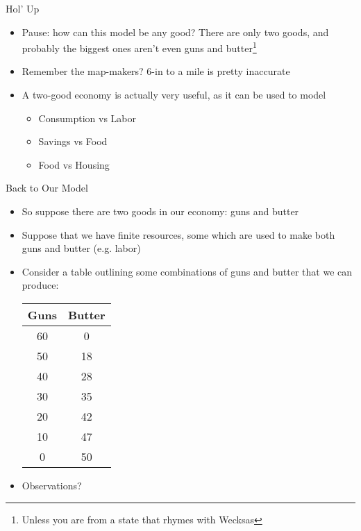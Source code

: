 \documentclass[10pt,xcolor={svgnames}]{beamer}
\begin{document}
\begin{frame}{Hol' Up}
    \begin{itemize}[<+->]
        \item Pause: how can this model be any good? There are only two goods, and probably the biggest ones aren't even guns and butter\footnote{Unless you are from a state that rhymes with Wecksas}
        \item Remember the map-makers? 6-in to a mile is pretty inaccurate
        \item A two-good economy is actually very useful, as it can be used to model
        \begin{itemize}
            \item Consumption vs Labor
            \item Savings vs Food
            \item Food vs Housing
        \end{itemize}
    \end{itemize}
\end{frame}


\begin{frame}{Back to Our Model}
    \begin{itemize}[<+->]
        \item So suppose there are two goods in our economy: guns and butter
        \item Suppose that we have finite resources, some which are used to make both guns and butter (e.g. labor) 
        \item Consider a table outlining some combinations of guns and butter that we can produce:
        \begin{table}[H]
            \centering
            \begin{tabular}{c|c}
                Guns & Butter  \\
                \hline
                60 & 0\\
                50 & 18\\
                40 & 28\\
                30 & 35\\
                20 & 42\\
                10 & 47\\
                0 & 50\\
            \end{tabular}
        \end{table}
        \item Observations?
    \end{itemize}
\end{frame}
\end{document}
